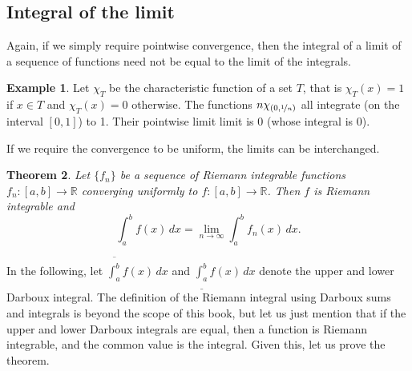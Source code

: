 \documentclass[12pt,openany]{book}
\newcommand{\R}{{\mathbb{R}}}
\theoremstyle{plain}
\newtheorem{thm}{Theorem}[section]
\theoremstyle{remark}
\theoremstyle{definition}
\theoremstyle{exercise}
\theoremstyle{example}
\newtheorem{example}[thm]{Example}
\begin{document}
\subsection{Integral of the limit}

Again, if we simply require pointwise convergence, then the integral
of a limit of a sequence of functions need not be equal to the limit
of the integrals.

\begin{example}
Let $\chi_{T}$ be the characteristic function of a set $T$, that is $\chi_T(x) =
1$ if $x \in T$ and $\chi_T(x) = 0$ otherwise.
The functions $n \chi_{(0,\nicefrac{1}{n})}$ all integrate (on the interval
$[0,1]$) to 1.  Their
pointwise limit limit is 0 (whose integral is 0).
\end{example}

If we require the convergence to be uniform, the limits can
be interchanged.

\begin{thm} \label{integralinterchange:thm}
Let $\{ f_n \}$ be a sequence of Riemann integrable
functions
$f_n \colon [a,b] \to \R$
converging uniformly to $f \colon [a,b]
\to \R$.  Then $f$ is Riemann integrable and
\begin{equation*}
\int_a^b f(x) \, dx = \lim_{n\to\infty} \int_a^b f_n(x) \, dx .
\end{equation*}
\end{thm}

In the following, let 
$\overline{\int_a^b} f(x)\, dx$ and 
$\underline{\int_a^b} f(x)\, dx$ denote the upper and lower Darboux integral.
The definition of the Riemann integral using Darboux sums and integrals is
beyond the scope of this book, but let us just mention that 
if the upper and lower Darboux integrals are equal, then a function is
Riemann integrable, and the common value is the integral.  Given this,
let us prove the theorem.
\end{document}

